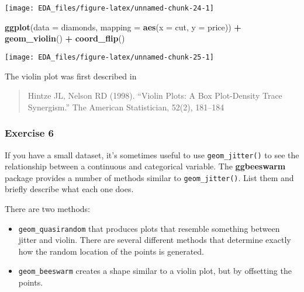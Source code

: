 \documentclass[]{book}
\newenvironment{Shaded}{\begin{snugshade}}{\end{snugshade}}
\newcommand{\DataTypeTok}[1]{\textcolor[rgb]{0.13,0.29,0.53}{#1}}
\newcommand{\KeywordTok}[1]{\textcolor[rgb]{0.13,0.29,0.53}{\textbf{#1}}}
\newcommand{\NormalTok}[1]{#1}
\newcommand{\OperatorTok}[1]{\textcolor[rgb]{0.81,0.36,0.00}{\textbf{#1}}}
\newcommand{\StringTok}[1]{\textcolor[rgb]{0.31,0.60,0.02}{#1}}
\providecommand{\tightlist}{%
  \setlength{\itemsep}{0pt}\setlength{\parskip}{0pt}}
\theoremstyle{plain}
\theoremstyle{remark}
\theoremstyle{definition}
\theoremstyle{definition}
\theoremstyle{definition}
\theoremstyle{remark}
\begin{document}
\begin{center}\texttt{[image: EDA\_files/figure-latex/unnamed-chunk-24-1]} \end{center}

\begin{Shaded}
\begin{Highlighting}[]
\KeywordTok{ggplot}\NormalTok{(}\DataTypeTok{data =}\NormalTok{ diamonds, }\DataTypeTok{mapping =} \KeywordTok{aes}\NormalTok{(}\DataTypeTok{x =}\NormalTok{ cut, }\DataTypeTok{y =}\NormalTok{ price)) }\OperatorTok{+}
\StringTok{  }\KeywordTok{geom_violin}\NormalTok{() }\OperatorTok{+}
\StringTok{  }\KeywordTok{coord_flip}\NormalTok{()}
\end{Highlighting}
\end{Shaded}

\begin{center}\texttt{[image: EDA\_files/figure-latex/unnamed-chunk-25-1]} \end{center}

The violin plot was first described in

\begin{quote}
Hintze JL, Nelson RD (1998). ``Violin Plots: A Box Plot-Density Trace
Synergism.'' The American Statistician, 52(2), 181--184
\end{quote}

\hypertarget{exercise-6-5}{%
\subsubsection{Exercise 6}\label{exercise-6-5}}

If you have a small dataset, it's sometimes useful to use
\texttt{geom\_jitter()} to see the relationship between a continuous and
categorical variable. The \textbf{ggbeeswarm} package provides a number
of methods similar to \texttt{geom\_jitter()}. List them and briefly
describe what each one does.

There are two methods:

\begin{itemize}
\tightlist
\item
  \texttt{geom\_quasirandom} that produces plots that resemble something
  between jitter and violin. There are several different methods that
  determine exactly how the random location of the points is generated.
\item
  \texttt{geom\_beeswarm} creates a shape similar to a violin plot, but
  by offsetting the points.
\end{itemize}
\end{document}
